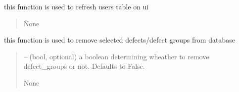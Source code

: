 \documentclass[letterpaper,10pt,english]{sphinxmanual}
\begin{document}
\begin{savenotes}
\begin{fulllineitems}
\begin{savenotes}
\begin{fulllineitems}
\begin{quote}
\begin{description}
\end{description}\end{quote}

\end{fulllineitems}\end{savenotes}


\begin{savenotes}\begin{fulllineitems}
\label{\detokenize{setting/setting_api:oxin.setting_api.API.refresh_users_table}}
\pysigstartsignatures
{}
\pysigstopsignatures
\sphinxAtStartPar
this function is used to refresh users table on ui
\begin{quote}\begin{description}
\sphinxAtStartPar
None

\end{description}\end{quote}

\end{fulllineitems}\end{savenotes}


\begin{savenotes}\begin{fulllineitems}
\label{\detokenize{setting/setting_api:oxin.setting_api.API.remove_defects}}
\pysigstartsignatures
{}
\pysigstopsignatures
\sphinxAtStartPar
this function is used to remove selected defects/defect groups from database
\begin{quote}\begin{description}
\sphinxAtStartPar
{} – (bool, optional) a boolean determining wheather to remove defect\_groups or not. Defaults to False.

\sphinxAtStartPar
None

\end{description}\end{quote}


\end{fulllineitems}
\end{savenotes}
\end{fulllineitems}
\end{savenotes}
\end{document}
